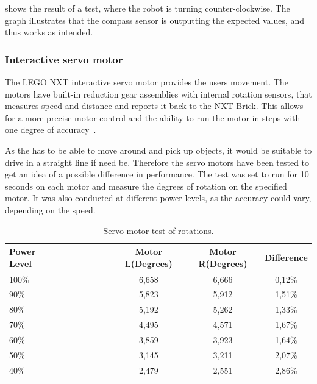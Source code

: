  shows the result of a test, where the robot is turning counter-clockwise. The graph illustrates that the compass sensor is outputting the expected values, and thus works as intended. 

\subsubsection{Interactive servo motor} \label{sec:servo_motor}
The LEGO NXT interactive servo motor provides the users movement. The motors have built-in reduction gear assemblies with internal rotation sensors, that measures speed and distance and reports it back to the NXT Brick. This allows for a more precise motor control and the ability to run the motor in steps with one degree of accuracy~\citep{lego_education}.

As the \projname{} has to be able to move around and pick up objects, it would be suitable to drive in a straight line if need be. Therefore the servo motors have been tested to get an idea of a possible difference in performance. The test was set to run for 10 seconds on each motor and measure the degrees of rotation on the specified motor. It was also conducted at different power levels, as the accuracy could vary, depending on the speed. 

\begin{table}[H]
	\centering
    \begin{tabular}{lccc}
    \hline  
    \rowcolor{DGray}
    \textbf{Power Level}~~~~~~~~~~~~ & Motor L(Degrees) & Motor R(Degrees) & Difference \\ \hline 
    100\%                  & 6,658                  & 6,666                & 0,12\% \\
    90\%                   & 5,823                  & 5,912                & 1,51\% \\
    80\%                   & 5,192                  & 5,262                & 1,33\% \\
    70\%                   & 4,495                  & 4,571                & 1,67\% \\
    60\%                   & 3,859                  & 3,923                & 1,64\% \\
    50\%                   & 3,145                  & 3,211                & 2,07\% \\
    40\%                   & 2,479                  & 2,551                & 2,86\% \\
    \hline 
    \end{tabular}
    \caption{\label{table:servo_motor_test} Servo motor test of rotations.}
\end{table}

